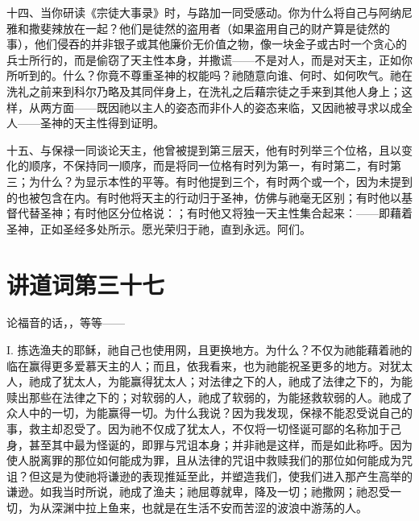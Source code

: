 十四、当你研读《宗徒大事录》时，与路加一同受感动。你为什么将自己与阿纳尼雅和撒斐辣放在一起？他们是徒然的盗用者（如果盗用自己的财产算是徒然的事），他们侵吞的并非银子或其他廉价无价值之物，像一块金子或古时一个贪心的兵士所行的，而是偷窃了天主性本身，并撒谎——不是对人，而是对天主，正如你所听到的。什么？你竟不尊重圣神的权能吗？祂随意向谁、何时、如何吹气。祂在洗礼之前来到科尔乃略及其同伴身上，在洗礼之后藉宗徒之手来到其他人身上；这样，从两方面——既因祂以主人的姿态而非仆人的姿态来临，又因祂被寻求以成全人——圣神的天主性得到证明。\par

十五、与保禄一同谈论天主，他曾被提到第三层天，他有时列举三个位格，且以变化的顺序，不保持同一顺序，而是将同一位格有时列为第一，有时第二，有时第三；为什么？为显示本性的平等。有时他提到三个，有时两个或一个，因为未提到的也被包含在内。有时他将天主的行动归于圣神，仿佛与祂毫无区别；有时他以基督代替圣神；有时他区分位格说：；有时他又将独一天主性集合起来：——即藉着圣神，正如圣经多处所示。愿光荣归于祂，直到永远。阿们。\par



\section{讲道词第三十七}

论福音的话，，等等——\par

I. 拣选渔夫的耶稣，祂自己也使用网，且更换地方。为什么？不仅为祂能藉着祂的临在赢得更多爱慕天主的人；而且，依我看来，也为祂能祝圣更多的地方。对犹太人，祂成了犹太人，为能赢得犹太人；对法律之下的人，祂成了法律之下的，为能赎出那些在法律之下的；对软弱的人，祂成了软弱的，为能拯救软弱的人。祂成了众人中的一切，为能赢得一切。为什么我说？因为我发现，保禄不能忍受说自己的事，救主却忍受了。因为祂不仅成了犹太人，不仅将一切怪诞可鄙的名称加于己身，甚至其中最为怪诞的，即罪与咒诅本身；并非祂是这样，而是如此称呼。因为使人脱离罪的那位如何能成为罪，且从法律的咒诅中救赎我们的那位如何能成为咒诅？但这是为使祂将谦逊的表现推延至此，并塑造我们，使我们进入那产生高举的谦逊。如我当时所说，祂成了渔夫；祂屈尊就卑，降及一切；祂撒网；祂忍受一切，为从深渊中拉上鱼来，也就是在生活不安而苦涩的波浪中游荡的人。\par

